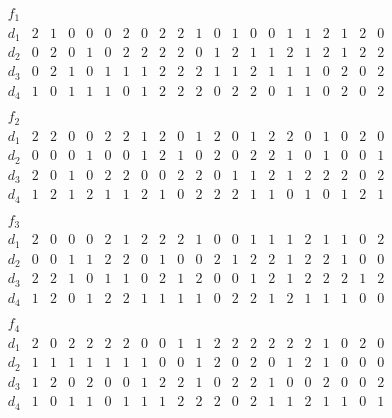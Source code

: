 $$\begin{array}{c|cccccccccccccccccccc} 
f_1 &&&&&&&&&&&&&&&&&&&&\\ 
\hline 
d_1 & 2& 1& 0& 0& 0& 2& 0& 2& 2& 1& 0& 1& 0& 0& 1& 1& 2& 1& 2& 0\\ 
d_2 & 0& 2& 0& 1& 0& 2& 2& 2& 2& 0& 1& 2& 1& 1& 2& 1& 2& 1& 2& 2\\ 
d_3 & 0& 2& 1& 0& 1& 1& 1& 2& 2& 2& 1& 1& 2& 1& 1& 1& 0& 2& 0& 2\\ 
d_4 & 1& 0& 1& 1& 1& 0& 1& 2& 2& 2& 0& 2& 2& 0& 1& 1& 0& 2& 0& 2\\ 
\end{array}$$ 
$$\begin{array}{c|cccccccccccccccccccc} 
f_2 &&&&&&&&&&&&&&&&&&&&\\ 
\hline 
d_1 & 2& 2& 0& 0& 2& 2& 1& 2& 0& 1& 2& 0& 1& 2& 2& 0& 1& 0& 2& 0\\ 
d_2 & 0& 0& 0& 1& 0& 0& 1& 2& 1& 0& 2& 0& 2& 2& 1& 0& 1& 0& 0& 1\\ 
d_3 & 2& 0& 1& 0& 2& 2& 0& 0& 2& 2& 0& 1& 1& 2& 1& 2& 2& 2& 0& 2\\ 
d_4 & 1& 2& 1& 2& 1& 1& 2& 1& 0& 2& 2& 2& 1& 1& 0& 1& 0& 1& 2& 1\\ 
\end{array}$$ 
$$\begin{array}{c|cccccccccccccccccccc} 
f_3 &&&&&&&&&&&&&&&&&&&&\\ 
\hline 
d_1 & 2& 0& 0& 0& 2& 1& 2& 2& 2& 1& 0& 0& 1& 1& 1& 2& 1& 1& 0& 2\\ 
d_2 & 0& 0& 1& 1& 2& 2& 0& 1& 0& 0& 2& 1& 2& 2& 1& 2& 2& 1& 0& 0\\ 
d_3 & 2& 2& 1& 0& 1& 1& 0& 2& 1& 2& 0& 0& 1& 2& 1& 2& 2& 2& 1& 2\\ 
d_4 & 1& 2& 0& 1& 2& 2& 1& 1& 1& 1& 0& 2& 2& 1& 2& 1& 1& 1& 0& 0\\ 
\end{array}$$ 
$$\begin{array}{c|cccccccccccccccccccc} 
f_4 &&&&&&&&&&&&&&&&&&&&\\ 
\hline 
d_1 & 2& 0& 2& 2& 2& 2& 0& 0& 1& 1& 2& 2& 2& 2& 2& 2& 1& 0& 2& 0\\ 
d_2 & 1& 1& 1& 1& 1& 1& 1& 0& 0& 1& 2& 0& 2& 0& 1& 2& 1& 0& 0& 0\\ 
d_3 & 1& 2& 0& 2& 0& 0& 1& 2& 2& 1& 0& 2& 2& 1& 0& 0& 2& 0& 0& 2\\ 
d_4 & 1& 0& 1& 1& 0& 1& 1& 1& 2& 2& 2& 0& 2& 1& 1& 2& 1& 1& 0& 1\\ 
\end{array}$$ 
